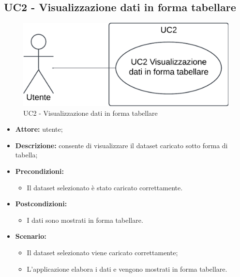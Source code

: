 \subsection{UC2 - Visualizzazione dati in forma tabellare}
\begin{figure}[h!]
    \centering
    \includegraphics[scale=0.7]{template/images/UC2.png}
    \caption{UC2 - Visualizzazione dati in forma tabellare}
\end{figure}
\begin{itemize}
    \item \textbf{Attore:} utente;
    \item \textbf{Descrizione:} consente di visualizzare il dataset caricato sotto forma di tabella;
    \item \textbf{Precondizioni:}
    \begin{itemize}
        \item Il dataset selezionato è stato caricato correttamente.
    \end{itemize}
    \item \textbf{Postcondizioni:}
    \begin{itemize}
        \item I dati sono mostrati in forma tabellare.
    \end{itemize}
    \item \textbf{Scenario:}
    \begin{itemize}
        \item Il dataset selezionato viene caricato correttamente;
        \item L'applicazione elabora i dati e vengono mostrati in forma tabellare.
    \end{itemize}
\end{itemize}
